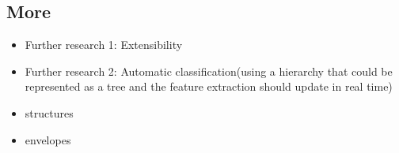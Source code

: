 \documentclass[a4paper,12pt]{article}
\begin{document}
\subsection{More}

\begin{itemize}
    \item Further research 1: Extensibility
    \item Further research 2: Automatic classification(using a hierarchy that could be represented as a tree and the feature extraction should update in real time)
    \item structures
    \item envelopes
\end{itemize}


\end{document}
